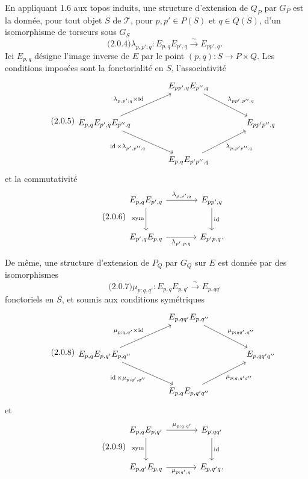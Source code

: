 \documentclass[11pt]{article}
\providecommand{\id}{\operatorname{id}}
\begin{document}
En appliquant 1.6 aux topos induits, une structure d'extension de \(Q_P\) par \(G_P\) est la donnée, pour tout objet \(S\) de \(\mathcal T\), pour \(p,p'\in P(S)\) et \(q\in Q(S)\), d'un isomorphisme de torseurs sous \(G_S\)
\begin{equation}\qquad\text{(2.0.4)}
  \lambda_{p,p';q}:E_{p,q}E_{p',q}\xrightarrow{\sim}E_{pp',q}.
\end{equation}
Ici \(E_{p,q}\) désigne l'image inverse de \(E\) par le point \((p,q):S\to P\times Q\).  Les conditions imposées sont la fonctorialité en \(S\), l'associativité
\begin{equation}\qquad\text{(2.0.5)}
\begin{tikzcd}[column sep=large,row sep=large]
& E_{pp',q}E_{p'',q}\arrow[dr,"\lambda_{pp',p'';q}"]&\\
E_{p,q}E_{p',q}E_{p'',q}
\arrow[ur,"\lambda_{p,p';q}\times\id"]
\arrow[dr,"\id\times\lambda_{p',p'';q}"']&&E_{pp'p'',q}\\
& E_{p,q}E_{p'p'',q}\arrow[ur,"\lambda_{p,p'p'';q}"']&
\end{tikzcd}
\end{equation}
et la commutativité
\begin{equation}\qquad\text{(2.0.6)}
\begin{tikzcd}[column sep=large,row sep=large]
E_{p,q}E_{p',q}\arrow[r,"\lambda_{p,p';q}"]\arrow[d,"\sym"']&E_{pp',q}\arrow[d,"\id"]\\
E_{p',q}E_{p,q}\arrow[r,"\lambda_{p',p;q}"']&E_{p'p,q}.
\end{tikzcd}
\end{equation}

De même, une structure d'extension de \(P_Q\) par \(G_Q\) sur \(E\) est donnée par des isomorphismes
\begin{equation}\qquad\text{(2.0.7)}
  \mu_{p;q,q'}:E_{p,q}E_{p,q'}\xrightarrow{\sim}E_{p,qq'}
\end{equation}
fonctoriels en \(S\), et soumis aux conditions symétriques
\begin{equation}\qquad\text{(2.0.8)}
\begin{tikzcd}[column sep=large,row sep=large]
& E_{p,qq'}E_{p,q''}\arrow[dr,"\mu_{p;qq',q''}"]&\\
E_{p,q}E_{p,q'}E_{p,q''}
\arrow[ur,"\mu_{p;q,q'}\times\id"]
\arrow[dr,"\id\times\mu_{p;q',q''}"']&&E_{p,qq'q''}\\
& E_{p,q}E_{p,q'q''}\arrow[ur,"\mu_{p;q,q'q''}"']&
\end{tikzcd}
\end{equation}
et
\begin{equation}\qquad\text{(2.0.9)}
\begin{tikzcd}[column sep=large,row sep=large]
E_{p,q}E_{p,q'}\arrow[r,"\mu_{p;q,q'}"]\arrow[d,"\sym"']&E_{p,qq'}\arrow[d,"\id"]\\
E_{p,q'}E_{p,q}\arrow[r,"\mu_{p;q',q}"']&E_{p,q'q}.
\end{tikzcd}
\end{equation}
\end{document}
